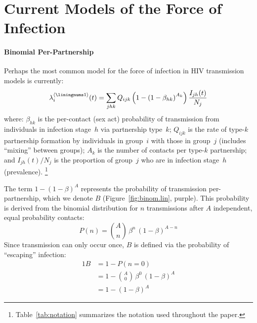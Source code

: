 \section{Current Models of the Force of Infection}\label{prior}
\paragraph{ Binomial Per-Partnership}
Perhaps the most common model for the force of infection in HIV transmission models is currently:
\begin{equation}\label{eq:foi.1}
  \lambda_i^{\case{1}}(t) =
  \sum_{jhk} Q_{ijk} \left(1 - {\left(1 - \beta_{hk}\right)}^{A_k}\right) \frac{I_{jh}(t)}{N_j}
\end{equation}
where:
$\beta_{hk}$ is the per-contact (sex act) probability of transmission
from individuals in infection stage~$h$ via partnership type~$k$;
$Q_{ijk}$ is the rate of type-$k$ partnership formation
by individuals in group~$i$ with those in group~$j$
(includes ``mixing'' between groups);
$A_k$ is the number of contacts per type-$k$ partnership; and
$I_{jh}(t) / N_j$ is the proportion of group~$j$ who are in infection stage~$h$ (prevalence).%
\footnote{Table~\ref{tab:notation} summarizes the notation used throughout the paper.}
\par
The term $1 - (1 - \beta)^A$ represents
the probability of transmission per-partnership, which we denote $B$
(Figure~\ref{fig:binom.lin}, purple).
This probability is derived from the binomial distribution
for $n$ transmissions after $A$ independent, equal probability contacts:
\begin{equation}
  P(n) = {A \choose n}\,\beta^n\,{(1 - \beta)}^{A-n}
\end{equation}
Since transmission can only occur once, $B$ is defined via the probability of ``escaping'' infection:
\begin{alignat}{1}\label{eq:B}
  B &= 1 - P(n = 0) \nonumber\\
  &= 1 - {A \choose 0}\,\beta^0\,{(1 - \beta)}^{A} \nonumber\\
  &= 1 - {(1 - \beta)}^A
\end{alignat}
